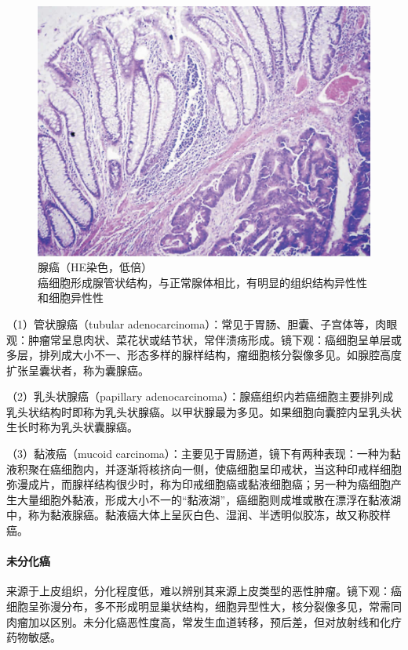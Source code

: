 \begin{figure}[!htbp]
  \centering
  \includegraphics{./images/Image00083.jpg}
  \caption{腺癌（HE染色，低倍）\\{\small 癌细胞形成腺管状结构，与正常腺体相比，有明显的组织结构异性性和细胞异性性}}
  \label{fig5-15}
\end{figure}



（1）管状腺癌（tubular
adenocarcinoma）：常见于胃肠、胆囊、子宫体等，肉眼观：肿瘤常呈息肉状、菜花状或结节状，常伴溃疡形成。镜下观：癌细胞呈单层或多层，排列成大小不一、形态多样的腺样结构，瘤细胞核分裂像多见。如腺腔高度扩张呈囊状者，称为囊腺癌。

（2）乳头状腺癌（papillary
adenocarcinoma）：腺癌组织内若癌细胞主要排列成乳头状结构时即称为乳头状腺癌。以甲状腺最为多见。如果细胞向囊腔内呈乳头状生长时称为乳头状囊腺癌。

（3）黏液癌（mucoid
carcinoma）：主要见于胃肠道，镜下有两种表现：一种为黏液积聚在癌细胞内，并逐渐将核挤向一侧，使癌细胞呈印戒状，当这种印戒样细胞弥漫成片，而腺样结构很少时，称为印戒细胞癌或黏液细胞癌；另一种为癌细胞产生大量细胞外黏液，形成大小不一的“黏液湖”，癌细胞则成堆或散在漂浮在黏液湖中，称为黏液腺癌。黏液癌大体上呈灰白色、湿润、半透明似胶冻，故又称胶样癌。

\paragraph{未分化癌}
来源于上皮组织，分化程度低，难以辨别其来源上皮类型的恶性肿瘤。镜下观：癌细胞呈弥漫分布，多不形成明显巢状结构，细胞异型性大，核分裂像多见，常需同肉瘤加以区别。未分化癌恶性度高，常发生血道转移，预后差，但对放射线和化疗药物敏感。

